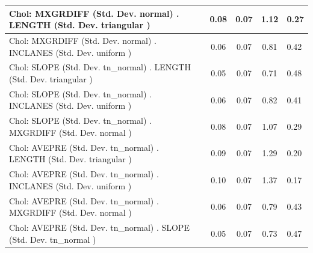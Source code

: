 \begin{table}
\begin{center}
\begin{tabular}{|l|l|c|c|c|l|}
			\hline
			 Chol: MXGRDIFF (Std. Dev. normal) . LENGTH (Std. Dev.   triangular ) &  & 0.08 & 0.07 & 1.12 & 0.27 \\
			\hline
			 Chol: MXGRDIFF (Std. Dev. normal) . INCLANES (Std. Dev.   uniform ) &  & 0.06 & 0.07 & 0.81 & 0.42 \\
			\hline
			 Chol: SLOPE (Std. Dev. tn_normal) . LENGTH (Std. Dev.   triangular ) &  & 0.05 & 0.07 & 0.71 & 0.48 \\
			\hline
			 Chol: SLOPE (Std. Dev. tn_normal) . INCLANES (Std. Dev.   uniform ) &  & 0.06 & 0.07 & 0.82 & 0.41 \\
			\hline
			 Chol: SLOPE (Std. Dev. tn_normal) . MXGRDIFF (Std. Dev.   normal ) &  & 0.08 & 0.07 & 1.07 & 0.29 \\
			\hline
			 Chol: AVEPRE (Std. Dev. tn_normal) . LENGTH (Std. Dev.   triangular ) &  & 0.09 & 0.07 & 1.29 & 0.20 \\
			\hline
			 Chol: AVEPRE (Std. Dev. tn_normal) . INCLANES (Std. Dev.   uniform ) &  & 0.10 & 0.07 & 1.37 & 0.17 \\
			\hline
			 Chol: AVEPRE (Std. Dev. tn_normal) . MXGRDIFF (Std. Dev.   normal ) &  & 0.06 & 0.07 & 0.79 & 0.43 \\
			\hline
			 Chol: AVEPRE (Std. Dev. tn_normal) . SLOPE (Std. Dev.   tn_normal ) &  & 0.05 & 0.07 & 0.73 & 0.47 \\
			\hline
		\end{tabular}
	\end{center}
\end{table}